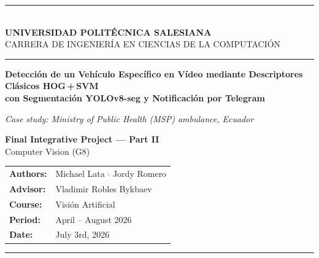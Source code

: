 \documentclass[12pt, a4paper]{article}
\begin{document}
\begin{titlepage}
\centering
\vspace*{0.8cm}
{\color{salesiana}\rule{\linewidth}{2pt}}\\[0.35cm]
{\Large\bfseries UNIVERSIDAD POLIT\'ECNICA SALESIANA}\\[0.15cm]
{\normalsize CARRERA DE INGENIER\'IA EN CIENCIAS DE LA COMPUTACI\'ON}\\[0.2cm]
{\color{salesiana}\rule{\linewidth}{1pt}}

\vspace{2.2cm}
\parbox{0.86\textwidth}{\centering\LARGE\bfseries\color{salesiana}
  Detecci\'on de un Veh\'iculo Espec\'ifico en V\'ideo mediante
  Descriptores Cl\'asicos HOG\,+\,SVM\\[0.3cm]
  \large con Segmentaci\'on YOLOv8-seg y Notificaci\'on por Telegram
}

\vspace{1.2cm}
\parbox{0.80\textwidth}{\centering\normalsize\itshape\color{black!70}
  Case study: Ministry of Public Health (MSP) ambulance,
  Ecuador
}

\vspace{1.4cm}
{\large\bfseries Final Integrative Project --- Part II}\\[0.2cm]
{\normalsize Computer Vision (G8)}

\vspace{1.6cm}
\begin{tabular}{@{}ll@{}}
\textbf{Authors:}  & Michael Lata $\cdot$ Jordy Romero \\[0.25cm]
\textbf{Advisor:}  & Vladimir Robles Bykbaev \\[0.25cm]
\textbf{Course:}   & Visi\'on Artificial \\[0.25cm]
\textbf{Period:}   & April -- August 2026 \\[0.25cm]
\textbf{Date:}     & July 3rd, 2026 \\
\end{tabular}

\vfill
{\color{salesiana}\rule{\linewidth}{2pt}}
\end{titlepage}
\end{document}
